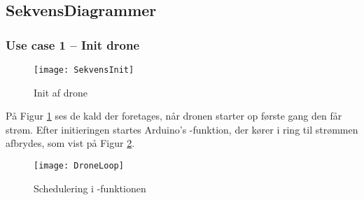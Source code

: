 \documentclass[Main]{subfiles}
\begin{document}
\subsection{SekvensDiagrammer}

\subsubsection{Use case 1 -- Init drone}

\begin{figure}[H]
\centering
\texttt{[image: SekvensInit]}
\caption{Init af drone}
\label{Fig:SekvInit}
\end{figure}

På Figur \ref{Fig:SekvInit} ses de kald der foretages, når dronen starter op første gang den får strøm.
Efter initieringen startes Arduino's -funktion, der kører i ring til strømmen afbrydes, som vist på Figur \ref{Fig:SekvDroneHz}.


\begin{figure}[htbp]
\centering
\texttt{[image: DroneLoop]}
\caption{Schedulering i -funktionen}
\label{Fig:SekvDroneHz}
\end{figure}
\end{document}
